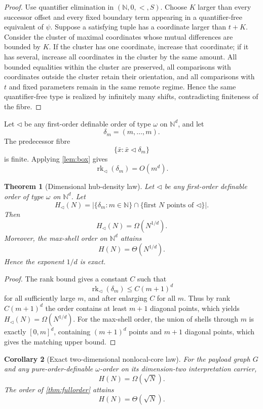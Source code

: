 \documentclass[11pt]{article}
\newtheorem{theorem}{Theorem}[section]
\newtheorem{corollary}[theorem]{Corollary}
\theoremstyle{definition}
\newcommand{\N}{\mathbb N}
\newcommand{\rk}{\operatorname{rk}}
\begin{document}
\begin{proof}
Use quantifier elimination in $(\N,0,<,S)$.  Choose $K$ larger than every successor offset and every fixed boundary term appearing in a quantifier-free equivalent of $\psi$.  Suppose a satisfying tuple has a coordinate larger than $t+K$.  Consider the cluster of maximal coordinates whose mutual differences are bounded by $K$.  If the cluster has one coordinate, increase that coordinate; if it has several, increase all coordinates in the cluster by the same amount.  All bounded equalities within the cluster are preserved, all comparisons with coordinates outside the cluster retain their orientation, and all comparisons with $t$ and fixed parameters remain in the same remote regime.  Hence the same quantifier-free type is realized by infinitely many shifts, contradicting finiteness of the fibre.
\end{proof}

Let $\triangleleft$ be any first-order definable order of type $\omega$ on $\N^d$, and let
\[
\delta_m=(m,\dots,m).
\]
The predecessor fibre
\[
\{\bar x:\bar x\triangleleft\delta_m\}
\]
is finite.  Applying \cref{lem:box} gives
\[
\rk_{\triangleleft}(\delta_m)=O(m^d).
\]

\begin{theorem}[Dimensional hub-density law]\label{thm:hubs}
Let $\triangleleft$ be any first-order definable order of type $\omega$ on $\N^d$.  Let
\[
H_{\triangleleft}(N)=
\bigl|\{\delta_m:m\in\N\}\cap\{\text{first }N\text{ points of }\triangleleft\}\bigr|.
\]
Then
\[
H_{\triangleleft}(N)=\Omega(N^{1/d}).
\]
Moreover, the max-shell order on $\N^d$ attains
\[
H(N)=\Theta(N^{1/d}).
\]
Hence the exponent $1/d$ is exact.
\end{theorem}

\begin{proof}
The rank bound gives a constant $C$ such that
\[
\rk_{\triangleleft}(\delta_m)\le C(m+1)^d
\]
for all sufficiently large $m$, and after enlarging $C$ for all $m$.  Thus by rank $C(m+1)^d$ the order contains at least $m+1$ diagonal points, which yields $H_{\triangleleft}(N)=\Omega(N^{1/d})$.  For the max-shell order, the union of shells through $m$ is exactly $[0,m]^d$, containing $(m+1)^d$ points and $m+1$ diagonal points, which gives the matching upper bound.
\end{proof}

\begin{corollary}[Exact two-dimensional nonlocal-core law]\label{cor:sqrt}
For the payload graph $G$ and any pure-order-definable $\omega$-order on its dimension-two interpretation carrier,
\[
H(N)=\Omega(\sqrt N).
\]
The order of \cref{thm:fullorder} attains
\[
H(N)=\Theta(\sqrt N).
\]
\end{corollary}
\end{document}
